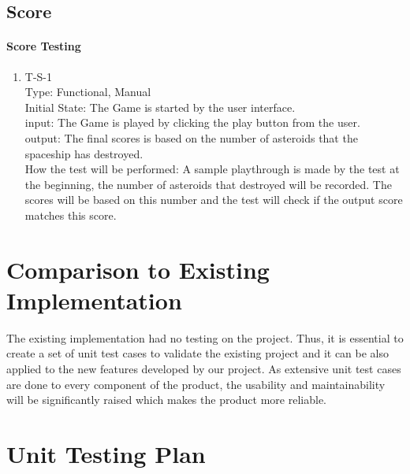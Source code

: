 \documentclass[12pt, titlepage]{article}
\begin{document}
\subsection{Score}
\paragraph{Score Testing}

\begin{enumerate}

\item{T-S-1\\}
Type: Functional, Manual\\

Initial State: The Game is started by the user interface.\\

input: The Game is played by clicking the play button from the user.\\

output: The final scores is based on the number of asteroids that the spaceship has destroyed.\\

How the test will be performed: A sample playthrough is made by the test at the beginning, the number of asteroids that destroyed will be recorded. The scores will be based on this number and the test will check if the output score matches this score.\\


\end{enumerate}

	
\section{Comparison to Existing Implementation}	
The existing implementation had no testing on the project. Thus, it is essential to create a set of unit test cases to validate the existing project and it can be also applied to the new features developed by our project. As extensive unit test cases are done to every component of the product, the usability and maintainability will be significantly raised which makes the product more reliable.
				
\section{Unit Testing Plan}
		
\end{document}
